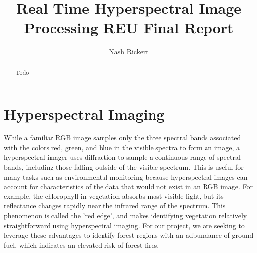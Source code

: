 \documentclass[psamsfonts]{amsart}
\title{Real Time Hyperspectral Image Processing REU Final Report}
\author{Nash Rickert}
\theoremstyle{definition}
\theoremstyle{remark}
\numberwithin{equation}{section}
\begin{document}
\begin{abstract}

  Todo


\end{abstract}

\maketitle

\tableofcontents

\section{Hyperspectral Imaging}
While a familiar RGB image samples only the three spectral bands associated with the colors red, green, and blue in the visible spectra to form an image, a hyperspectral imager uses diffraction to sample a continuous range of spectral bands, including those falling outside of the visible spectrum. This is useful for many tasks such as environmental monitoring because hyperspectral images can account for characteristics of the data that would not exist in an RGB image. For example, the chlorophyll in vegetation absorbs most visible light, but its reflectance changes rapidly near the infrared range of the spectrum. This phenomenon is called the 'red edge', and makes identifying vegetation relatively straightforward using hyperspectral imaging. For our project, we are seeking to leverage these advantages to identify forest regions with an adbundance of ground fuel, which indicates an elevated risk of forest fires.
\end{document}
